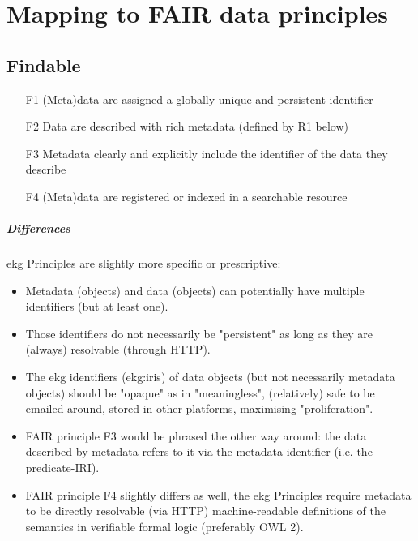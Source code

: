 \chapter{Mapping to FAIR data principles}

\section{Findable}

\begin{itemize}
    \item[F1] (Meta)data are assigned a globally unique and persistent identifier
    \item[F2] Data are described with rich metadata (defined by R1 below)
    \item[F3] Metadata clearly and explicitly include the identifier of the data they describe
    \item[F4] (Meta)data are registered or indexed in a searchable resource
\end{itemize}

\paragraph{Differences}

\gls{ekg} Principles are slightly more specific or prescriptive:

\begin{itemize}
    \item Metadata (objects) and data (objects) can potentially have multiple identifiers (but at least one).
    \item Those identifiers do not necessarily be "persistent" as long as they are (always) resolvable (through HTTP).
    \item The \gls{ekg} identifiers (\glspl{ekg:iri}) of data objects (but not necessarily metadata objects) should be
          "opaque" as in "meaningless", (relatively) safe to be emailed around, stored in other platforms,
          maximising "proliferation".
    \item FAIR principle F3 would be phrased the other way around: the data described by metadata refers to it via
          the metadata identifier (i.e. the predicate-IRI).
    \item FAIR principle F4 slightly differs as well, the \gls{ekg} Principles require metadata to be directly
          resolvable (via HTTP) machine-readable definitions of the semantics in verifiable formal logic
          (preferably OWL 2).
\end{itemize}

